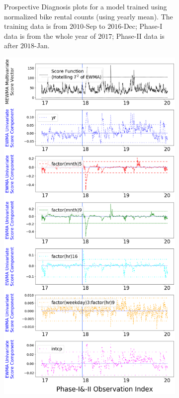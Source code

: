 \documentclass[twoside,11pt]{article}
\begin{document}
\begin{enumerate}
\begin{figure}[H]
\begin{subfigure}[t]{0.32\linewidth}
     \captionsetup{width=.95\linewidth}
     \caption{Prospective Diagnosis plots for a model trained using normalized bike rental counts (using yearly mean). The training data is from $2010$-Sep to $2016$-Dec; Phase-I data is from the whole year of $2017$; Phase-II data is after $2018$-Jan.}
     \label{fig:bs_raw_cnt}
\end{subfigure}
\begin{subfigure}[t]{0.32\linewidth}
     \centering
         \includegraphics[width=1.0\textwidth, trim=.0in .0in .0in .0in, clip]{../figures/v14/bike_sharing/reg_lin_D_1/neg_single_bike_fisher_mlines_with_regu_1e-08_0_0001_0_01_99_99.png}

\end{subfigure}
\end{figure}
\end{enumerate}
\end{document}
